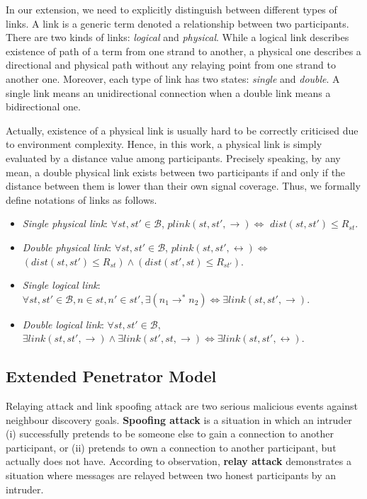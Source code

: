 In our extension, we need to explicitly distinguish between different types of links. A link is a generic term denoted a relationship between two participants. There are two kinds of links: \emph{logical} and \emph{physical}. While a logical link describes existence of path of a term from one strand to another, a physical one describes a directional and physical path without any relaying point from one strand to another one. Moreover, each type of link has two states: \emph{single} and \emph{double}. A single link means an unidirectional connection when a double link means a bidirectional one. 

Actually, existence of a physical link is usually hard to be correctly criticised due to environment complexity. Hence, in this work, a physical link is simply evaluated by a distance value among participants. Precisely speaking, by any mean, a double physical link exists between two participants if and only if the distance between them is lower than their own signal coverage. Thus, we formally define notations of links as follows.

\begin{Definition}
\begin{itemize}
\item \emph{Single physical link}: $\forall st,st' \in \mathcal{B}$, $plink(st,st', \rightarrow) \Leftrightarrow$ $dist(st,st') \le R_{st}$.
\item \emph{Double physical link}: $\forall st,st' \in \mathcal{B}$, $plink(st,st', \leftrightarrow) \Leftrightarrow$ $(dist(st,st') \le R_{st}) \wedge (dist(st',st) \le R_{st'})$.
\item \emph{Single logical link}: $\forall st, st' \in \mathcal{B}, n \in st, n' \in st', \exists (n_1 \rightarrow^* n_2) \Leftrightarrow \exists link(st, st',\rightarrow)$.
\item \emph{Double logical link}: $\forall st, st' \in \mathcal{B},$ $ \exists link(st, st',\rightarrow) \wedge \exists link(st', st,\rightarrow) \Leftrightarrow \exists link(st, st',\leftrightarrow)$.
\end{itemize}	
\end{Definition}

\subsection{Extended Penetrator Model}\label{penndp2}

Relaying attack and link spoofing attack are two serious malicious events against neighbour discovery goals. \textbf{Spoofing attack} is a situation in which an intruder (i) successfully pretends to be someone else to gain a connection to another participant, or (ii) pretends to own a connection to another participant, but actually does not have. According to observation, \textbf{relay attack} demonstrates a situation where messages are relayed between two honest participants by an intruder. 

